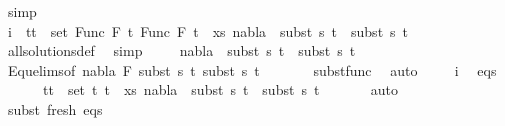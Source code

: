 \begin{isabellebody}
\ simp\isanewline
\isanewline
\ \ \ \isamarkupfalse%
\ {}\isanewline
\ \ \ \isamarkupfalse%
\ i{\isacharcolon}{\kern0pt}\ {\isachardoublequoteopen}{\isasymforall}\ {\isacharparenleft}{\kern0pt}t{}{\isacharcomma}{\kern0pt}t{}{\isacharparenright}{\kern0pt}\ {\isasymin}\ set\ {\isacharparenleft}{\kern0pt}{\isacharparenleft}{\kern0pt}Func\ F\ t{}{\isacharcomma}{\kern0pt}\ Func\ F\ t{}{\isacharparenright}{\kern0pt}\ {\isacharhash}{\kern0pt}\ xs{\isacharparenright}{\kern0pt}{\isachardot}{\kern0pt}\ nabla{}\ {\isasymturnstile}\ subst\ s{}\ t{}\ {\isasymapprox}\ subst\ s{}\ t{}{\isachardoublequoteclose}\isanewline
\ \ \ \ \ \isamarkupfalse%
\ all{\isacharunderscore}{\kern0pt}solutions{\isacharunderscore}{\kern0pt}def\ \isamarkupfalse%
\ simp\isanewline
\ \ \ \isamarkupfalse%
\ {\isachardoublequoteopen}nabla{}\ {\isasymturnstile}\ subst\ s{}\ t{}\ {\isasymapprox}\ subst\ s{}\ t{}{\isachardoublequoteclose}\ \isanewline
\ \ \ \ \ \isamarkupfalse%
\ Equ{\isacharunderscore}{\kern0pt}elims{\isacharparenleft}{\kern0pt}{}{\isacharparenright}{\kern0pt}{\isacharbrackleft}{\kern0pt}of\ nabla{}\ F\ {\isacartoucheopen}subst\ s{}\ t{}{\isacartoucheclose}\ {\isacartoucheopen}subst\ s{}\ t{}{\isacartoucheclose}{\isacharbrackright}{\kern0pt}\ \isanewline
\ \ \ \ \ \ subst{\isacharunderscore}{\kern0pt}func\ \isamarkupfalse%
\ auto\isanewline
\ \ \ \isamarkupfalse%
\ i\ \isamarkupfalse%
\ eqs{\isacharcolon}{\kern0pt}\ \isanewline
\ \ \ \ \ {\isachardoublequoteopen}{\isasymforall}\ {\isacharparenleft}{\kern0pt}t{}{\isacharcomma}{\kern0pt}t{}{\isacharparenright}{\kern0pt}\ {\isasymin}\ set\ {\isacharparenleft}{\kern0pt}{\isacharparenleft}{\kern0pt}t{}{\isacharcomma}{\kern0pt}\ t{}{\isacharparenright}{\kern0pt}\ {\isacharhash}{\kern0pt}\ xs{\isacharparenright}{\kern0pt}{\isachardot}{\kern0pt}\ nabla{}\ {\isasymturnstile}\ subst\ s{}\ t{}\ {\isasymapprox}\ subst\ s{}\ t{}{\isachardoublequoteclose}\isanewline
\ \ \ \ \ \isamarkupfalse%
\ auto\isanewline
\isanewline
\ \ \ \isamarkupfalse%
\ subst\ fresh\ eqs\isanewline
\ \ \ \isamarkupfalse%

\end{isabellebody}
